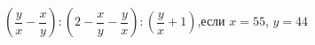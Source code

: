 \begin{ex}[type=calculate_expression]
	\begin{condition}
		\( \left( \dfrac{y}{x}-\dfrac{x}{y} \right):\left( 2-\dfrac{x}{y}-\dfrac{y}{x} \right):\left( \dfrac{y}{x}+1 \right) \),\quad если \( x=55 \), \( y=44 \)
	\end{condition}
\end{ex}